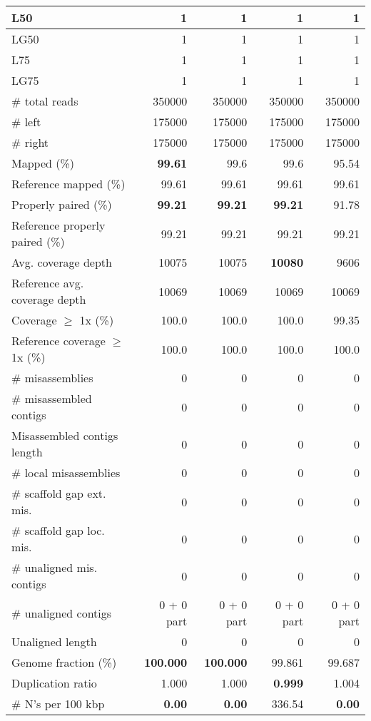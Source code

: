 \documentclass[12pt,a4paper]{article}
\begin{document}
\begin{table}[ht]
\begin{center}
\begin{tabular}{|l*{4}{|r}|}
L50 & 1 & 1 & 1 & 1 \\ \hline
LG50 & 1 & 1 & 1 & 1 \\ \hline
L75 & 1 & 1 & 1 & 1 \\ \hline
LG75 & 1 & 1 & 1 & 1 \\ \hline
\# total reads & 350000 & 350000 & 350000 & 350000 \\ \hline
\# left & 175000 & 175000 & 175000 & 175000 \\ \hline
\# right & 175000 & 175000 & 175000 & 175000 \\ \hline
Mapped (\%) & {\bf 99.61} & 99.6 & 99.6 & 95.54 \\ \hline
Reference mapped (\%) & 99.61 & 99.61 & 99.61 & 99.61 \\ \hline
Properly paired (\%) & {\bf 99.21} & {\bf 99.21} & {\bf 99.21} & 91.78 \\ \hline
Reference properly paired (\%) & 99.21 & 99.21 & 99.21 & 99.21 \\ \hline
Avg. coverage depth & 10075 & 10075 & {\bf 10080} & 9606 \\ \hline
Reference avg. coverage depth & 10069 & 10069 & 10069 & 10069 \\ \hline
Coverage $\geq$ 1x (\%) & 100.0 & 100.0 & 100.0 & 99.35 \\ \hline
Reference coverage $\geq$ 1x (\%) & 100.0 & 100.0 & 100.0 & 100.0 \\ \hline
\# misassemblies & 0 & 0 & 0 & 0 \\ \hline
\# misassembled contigs & 0 & 0 & 0 & 0 \\ \hline
Misassembled contigs length & 0 & 0 & 0 & 0 \\ \hline
\# local misassemblies & 0 & 0 & 0 & 0 \\ \hline
\# scaffold gap ext. mis. & 0 & 0 & 0 & 0 \\ \hline
\# scaffold gap loc. mis. & 0 & 0 & 0 & 0 \\ \hline
\# unaligned mis. contigs & 0 & 0 & 0 & 0 \\ \hline
\# unaligned contigs & 0 + 0 part & 0 + 0 part & 0 + 0 part & 0 + 0 part \\ \hline
Unaligned length & 0 & 0 & 0 & 0 \\ \hline
Genome fraction (\%) & {\bf 100.000} & {\bf 100.000} & 99.861 & 99.687 \\ \hline
Duplication ratio & 1.000 & 1.000 & {\bf 0.999} & 1.004 \\ \hline
\# N's per 100 kbp & {\bf 0.00} & {\bf 0.00} & 336.54 & {\bf 0.00} \\ \hline

\end{tabular}
\end{center}
\end{table}
\end{document}
